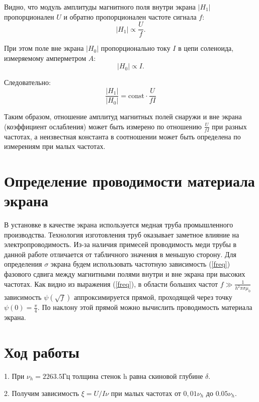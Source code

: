 \documentclass[a4paper, 12pt]{article} %
\begin{document}
	Видно, что модуль амплитуды магнитного поля внутри экрана $|H_1|$ пропорционален $U$ и обратно пропорционален частоте сигнала $f$:
	\begin{equation*}
		|H_1| \propto \frac{U}{f}.
	\end{equation*}

	При этом поле вне экрана $|H_0|$ пропорционально току $I$ в цепи соленоида, измеряемому амперметром $A$:
	\begin{equation*}
		|H_0| \propto I.
	\end{equation*} 

	Следовательно:
	\begin{equation}
		\frac{|H_1|}{|H_0|} = \text{const} \cdot \frac{U}{fI}
	\end{equation}

	Таким образом, отношение амплитуд магнитных полей снаружи и
	вне экрана (коэффициент ослабления) может быть измерено по отношению $\frac{U}{fI}$ при разных частотах, а неизвестная константа в соотношении может быть определена по измерениям при малых частотах.

	\section {Определение проводимости материала экрана}
	В установке в качестве экрана используется медная труба промышленного производства. Технология изготовления труб оказывает заметное влияние на электропроводимость. Из-за наличия примесей проводимость меди трубы в данной работе отличается от табличного значения в меньшую сторону. Для определения $\sigma$ экрана будем использовать частотную зависимость (\ref{freq}) фазового сдвига между магнитными полями внутри и вне экрана при высоких частотах. Как видно из выражения (\ref{freq}), в области больших частот $f \gg \frac{1}{h^2 \pi \sigma\mu_0}$ зависимость $\psi(\sqrt{f})$ аппроксимируется прямой, проходящей через точку $\psi(0) = \frac{\pi}{4}$. По наклону этой прямой можно вычислить проводимость материала экрана.
	
	\section *{Ход работы}
	
	1. При $ \nu_{h} = 2263.5 Гц 	$ толщина стенок h равна скиновой глубине $\delta$.
	
    2. Получим зависимость $\xi = U/I\nu$ при малых частотах от $0,01\nu_h$ до $0.05\nu_h$.
    
    
    
\end{document}
